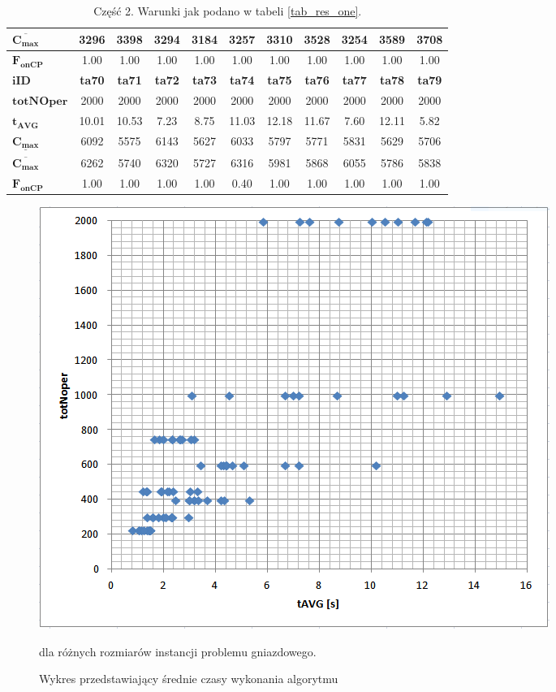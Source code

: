 \documentclass[printmode,oneside]{mgr}
\begin{document}
\begin{table}[!ht]
\begin{tabularx}{\textwidth}{|X|c|c|c|c|c|c|c|c|c|c|}
\hline
$\mathbf{\overline{C_{max}}}$ & 3296 & 3398 & 3294 & 3184 & 3257 & 3310 & 3528 & 3254 & 3589 & 3708\\
\hline
$\mathbf{F_{onCP}}$ & 1.00 & 1.00 & 1.00 & 1.00 & 1.00 & 1.00 & 1.00 & 1.00 & 1.00 & 1.00\\
\hline
\hline
$\mathbf{iID}$ & \textbf{ta70} & \textbf{ta71} & \textbf{ta72} & \textbf{ta73} & \textbf{ta74} & \textbf{ta75} & \textbf{ta76} & \textbf{ta77} & \textbf{ta78} & \textbf{ta79}\\
\hline
$\mathbf{totNOper}$ & 2000 & 2000 & 2000 & 2000 & 2000 & 2000 & 2000 & 2000 & 2000 & 2000\\
\hline
$\mathbf{t_{AVG}}$ & 10.01 & 10.53 & 7.23 & 8.75 & 11.03 & 12.18 & 11.67 & 7.60 & 12.11 & 5.82\\
\hline
$\mathbf{\underline{C_{max}}}$ & 6092 & 5575 & 6143 & 5627 & 6033 & 5797 & 5771 & 5831 & 5629 & 5706\\
\hline
$\mathbf{\overline{C_{max}}}$ & 6262 & 5740 & 6320 & 5727 & 6316 & 5981 & 5868 & 6055 & 5786 & 5838\\
\hline
$\mathbf{F_{onCP}}$ & 1.00 & 1.00 & 1.00 & 1.00 & 0.40 & 1.00 & 1.00 & 1.00 & 1.00 & 1.00\\
\hline
\end{tabularx}
\caption{Część 2. Warunki jak podano w tabeli \ref{tab_res_one}.}
\label{tab_res_two}
\renewcommand{\arraystretch}{1.0}
\end{table}
%
\begin{figure}[h!]
\begin{center}
\includegraphics[scale=0.7]{rysunki/wykres_czas_iID.png}
\caption{Wykres przedstawiający średnie czasy wykonania algorytmu}{dla różnych rozmiarów instancji problemu gniazdowego.}
\label{rys_wykres_czas_iID}
\end{center}
\end{figure}
\end{document}

